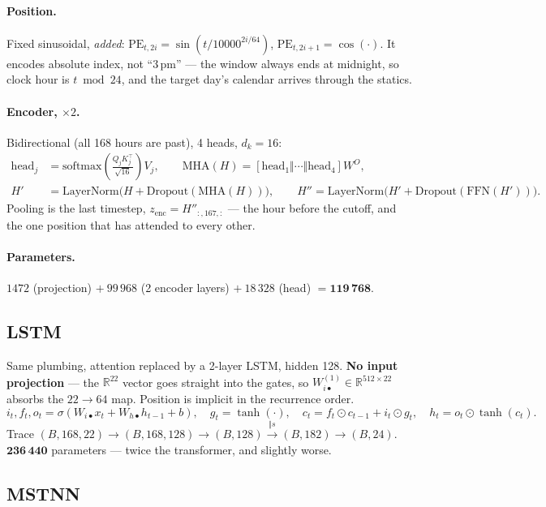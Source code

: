 \documentclass[11pt]{article}
\newcommand{\R}{\mathbb{R}}
\newcommand{\LN}{\mathrm{LayerNorm}}
\newcommand{\MHA}{\mathrm{MHA}}
\newcommand{\FFN}{\mathrm{FFN}}
\newcommand{\softmax}{\mathrm{softmax}}
\newcommand{\Drop}{\mathrm{Dropout}}
\begin{document}
\paragraph{Position.} Fixed sinusoidal, \emph{added}:
$\mathrm{PE}_{t,2i} = \sin(t/10000^{2i/64})$, $\mathrm{PE}_{t,2i+1} = \cos(\cdot)$.
It encodes absolute index, not ``3\,pm'' --- the window always ends at midnight, so
clock hour is $t \bmod 24$, and the target day's calendar arrives through the
statics.

\paragraph{Encoder, $\times2$.} Bidirectional (all 168 hours are past), 4 heads,
$d_k = 16$:
\begin{align}
\mathrm{head}_j &= \softmax\!\left(\tfrac{Q_jK_j^{\!\top}}{\sqrt{16}}\right)V_j,
  \qquad \MHA(H) = [\mathrm{head}_1\Vert\cdots\Vert\mathrm{head}_4]W^O, \\
H' &= \LN\big(H + \Drop(\MHA(H))\big), \qquad
H'' = \LN\big(H' + \Drop(\FFN(H'))\big).
\end{align}
Pooling is the last timestep, $z_{\text{enc}} = H''_{:,167,:}$ --- the hour before
the cutoff, and the one position that has attended to every other.

\paragraph{Parameters.} $1472$ (projection) $+\ 99\,968$ (2 encoder layers)
$+\ 18\,328$ (head) $= \mathbf{119\,768}$.

\subsection{LSTM}

Same plumbing, attention replaced by a 2-layer LSTM, hidden 128. \textbf{No input
projection} --- the $\R^{22}$ vector goes straight into the gates, so
$W_{i\bullet}^{(1)} \in \R^{512\times22}$ absorbs the $22\to64$ map. Position is
implicit in the recurrence order.
\[
i_t, f_t, o_t = \sigma(W_{i\bullet}x_t + W_{h\bullet}h_{t-1} + b),
\quad g_t = \tanh(\cdot),
\quad c_t = f_t \odot c_{t-1} + i_t \odot g_t,
\quad h_t = o_t \odot \tanh(c_t).
\]
Trace $(B,168,22) \to (B,168,128) \to (B,128) \xrightarrow{\Vert s} (B,182) \to (B,24)$.
$\mathbf{236\,440}$ parameters --- twice the transformer, and slightly worse.

\subsection{MSTNN}
\end{document}
